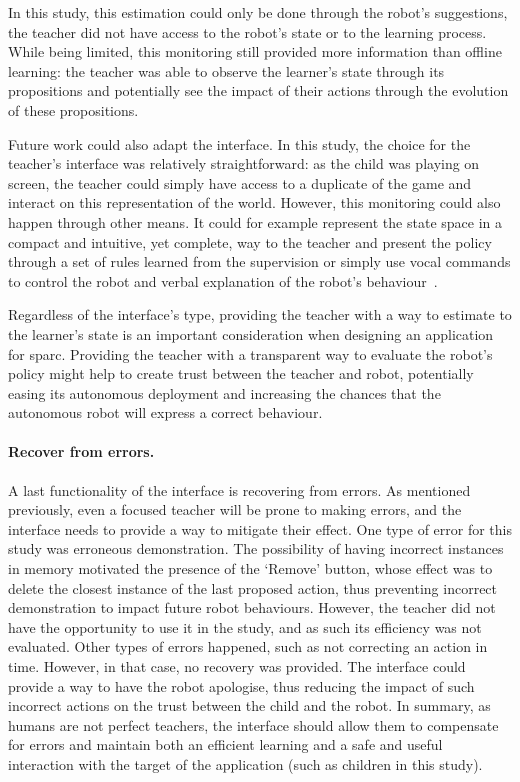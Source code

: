 In this study, this estimation could only be done through the robot's suggestions, the teacher did not have access to the robot's state or to the learning process. While being limited, this monitoring still provided more information than offline learning: the teacher was able to observe the learner's state through its propositions and potentially see the impact of their actions through the evolution of these propositions.

Future work could also adapt the interface. In this study, the choice for the teacher's interface was relatively straightforward: as the child was playing on screen, the teacher could simply have access to a duplicate of the game and interact on this representation of the world. However, this monitoring could also happen through other means. It could for example represent the state space in a compact and intuitive, yet complete, way to the teacher and present the policy through a set of rules learned from the supervision or simply use vocal commands to control the robot and verbal explanation of the robot's behaviour~\citep{hayes2017improving}.

Regardless of the interface's type, providing the teacher with a way to estimate to the learner's state is an important consideration when designing an application for \gls{sparc}. Providing the teacher with a transparent way to evaluate the robot's policy might help to create trust between the teacher and robot, potentially easing its autonomous deployment and increasing the chances that the autonomous robot will express a correct behaviour.

\paragraph{Recover from errors.}
A last functionality of the interface is recovering from errors. As mentioned previously, even a focused teacher will be prone to making errors, and the interface needs to provide a way to mitigate their effect. One type of error for this study was erroneous demonstration. The possibility of having incorrect instances in memory motivated the presence of the `Remove' button, whose effect was to delete the closest instance of the last proposed action, thus preventing incorrect demonstration to impact future robot behaviours. However, the teacher did not have the opportunity to use it in the study, and as such its efficiency was not evaluated. Other types of errors happened, such as not correcting an action in time. However, in that case, no recovery was provided. The interface could provide a way to have the robot apologise, thus reducing the impact of such incorrect actions on the trust between the child and the robot. In summary, as humans are not perfect teachers, the interface should allow them to compensate for errors and maintain both an efficient learning and a safe and useful interaction with the target of the application (such as children in this study).

